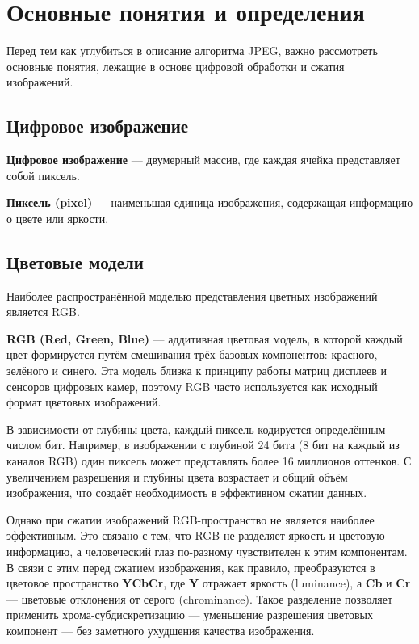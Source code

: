 \newpage
\section{Основные понятия и определения}

Перед тем как углубиться в описание алгоритма JPEG, важно рассмотреть основные понятия, лежащие в основе цифровой обработки и сжатия изображений.

\subsection*{Цифровое изображение}

\textbf{Цифровое изображение} — двумерный массив, где каждая ячейка представляет собой пиксель.

\textbf{Пиксель (pixel)} — наименьшая единица изображения, содержащая информацию о цвете или яркости.

\subsection*{Цветовые модели}

Наиболее распространённой моделью представления цветных изображений является RGB.

\textbf{RGB (Red, Green, Blue)} — аддитивная цветовая модель, в которой каждый цвет формируется путём смешивания трёх базовых компонентов: красного, зелёного и синего. 
Эта модель близка к принципу работы матриц дисплеев и сенсоров цифровых камер, поэтому RGB часто используется как исходный формат цветовых изображений.

В зависимости от глубины цвета, каждый пиксель кодируется определённым числом бит. 
Например, в изображении с глубиной 24 бита (8 бит на каждый из каналов RGB) один пиксель может представлять более 16 миллионов оттенков. 
С увеличением разрешения и глубины цвета возрастает и общий объём изображения, что создаёт необходимость в эффективном сжатии данных.

Однако при сжатии изображений RGB-пространство не является наиболее эффективным. Это связано с тем, что RGB не разделяет яркость и цветовую информацию, а человеческий глаз по-разному чувствителен к этим компонентам. 
В связи с этим перед сжатием изображения, как правило, преобразуются в цветовое пространство \textbf{YCbCr}, где \textbf{Y} отражает яркость (luminance), а \textbf{Cb} и \textbf{Cr} — цветовые отклонения от серого (chrominance). 
Такое разделение позволяет применить хрома-субдискретизацию — уменьшение разрешения цветовых компонент — без заметного ухудшения качества изображения.


